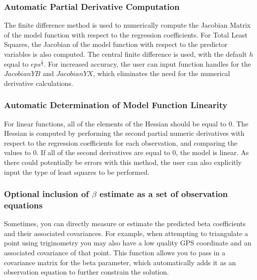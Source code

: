 \documentclass{article}
\begin{document}
	\subsubsection*{Automatic Partial Derivative Computation}
	The finite difference method is used to numerically compute the Jacobian Matrix of the model function with respect to the regression coefficients.  For Total Least Squares, the Jacobian of the model function with respect to the predictor variables is also computed.  The central finite difference is used, with the default $h$ equal to $eps^{\frac{1}{3}}$.  For increased accuracy, the user can input function handles for the $JacobianYB$ and $JacobianYX$, which eliminates the need for the numerical derivative calculations.
	
	\subsubsection*{Automatic Determination of Model Function Linearity}
	For linear functions, all of the elements of the Hessian should be equal to 0.  The Hessian is computed by performing the second partial numeric derivatives with respect to the regression coefficients for each observation, and comparing the values to 0. If all of the second derivatives are equal to 0, the model is linear.  As there could potentially be errors with this method, the user can also explicitly input the type of least squares to be performed.
	
	\subsubsection*{Optional inclusion of $\beta$ estimate as a set of observation equations}
	Sometimes, you can directly measure or estimate the predicted beta coefficients and their associated covariances.  For example, when attempting to triangulate a point using triginometry you may also have a low quality GPS coordinate and an associated covariance of that point.  This function allows you to pass in a covariance matrix for the beta parameter, which automatically adds it as an observation equation to further constrain the solution.
	
\end{document}
